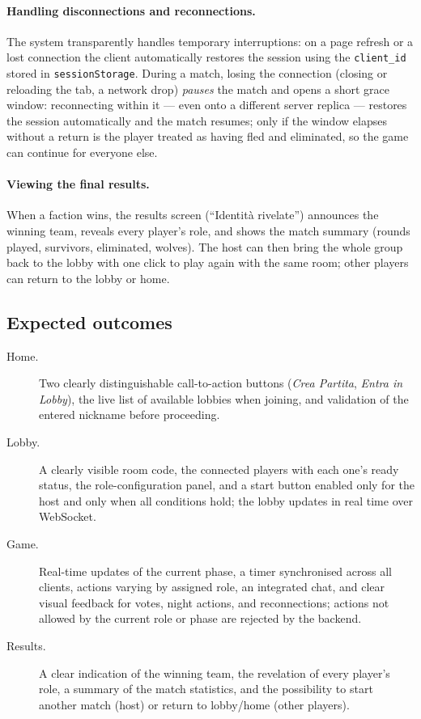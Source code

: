 \documentclass{scrartcl}
\begin{document}
\paragraph{Handling disconnections and reconnections.}
The system transparently handles temporary interruptions: on a page refresh or a
lost connection the client automatically restores the session using the
\texttt{client\_id} stored in \texttt{sessionStorage}. During a match, losing the
connection (closing or reloading the tab, a network drop) \emph{pauses} the match
and opens a short grace window: reconnecting within it --- even onto a different
server replica --- restores the session automatically and the match resumes; only
if the window elapses without a return is the player treated as having fled and
eliminated, so the game can continue for everyone else.

\paragraph{Viewing the final results.}
When a faction wins, the results screen (``Identità rivelate'') announces the
winning team, reveals every player's role, and shows the match summary (rounds
played, survivors, eliminated, wolves). The host can then bring the whole group
back to the lobby with one click to play again with the same room; other players
can return to the lobby or home.

\subsection{Expected outcomes}\label{sec:expected-outcomes}

\begin{description}
      \item[Home.] Two clearly distinguishable call-to-action buttons
            (\emph{Crea Partita}, \emph{Entra in Lobby}), the live list of available
            lobbies when joining, and validation of the entered nickname before proceeding.
      \item[Lobby.] A clearly visible room code, the connected players with each one's
            ready status, the role-configuration panel, and a start button enabled only for
            the host and only when all conditions hold; the lobby updates in real time over
            WebSocket.
      \item[Game.] Real-time updates of the current phase, a timer synchronised across
            all clients, actions varying by assigned role, an integrated chat, and clear
            visual feedback for votes, night actions, and reconnections; actions not allowed
            by the current role or phase are rejected by the backend.
      \item[Results.] A clear indication of the winning team, the revelation of every
            player's role, a summary of the match statistics, and the possibility to start
            another match (host) or return to lobby/home (other players).
\end{description}
\end{document}
